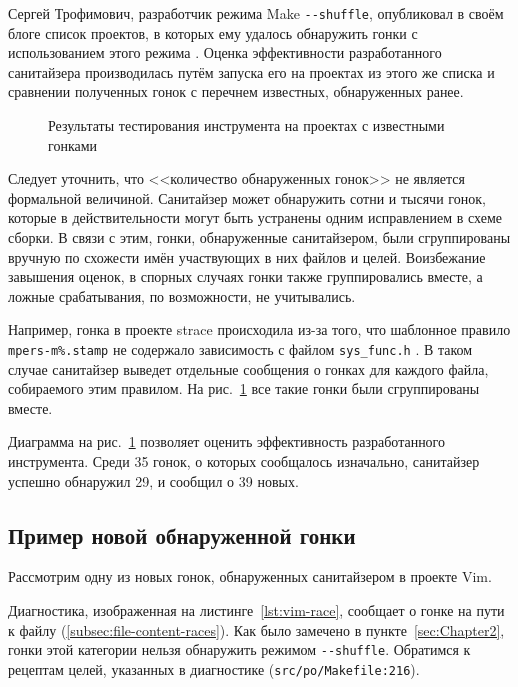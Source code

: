 Сергей Трофимович, разработчик режима Make \texttt{-{}-shuffle}, опубликовал в своём блоге список проектов, в которых ему удалось обнаружить гонки с использованием этого режима \cite{trofi-make-shuffle}. Оценка эффективности разработанного санитайзера производилась путём запуска его на проектах из этого же списка и сравнении полученных гонок с перечнем известных, обнаруженных ранее.

\begin{figure}[H]
    \centering
    
    \caption{Результаты тестирования инструмента на проектах с известными гонками}
    \label{fig:testing-results}
\end{figure}

Следует уточнить, что <<количество обнаруженных гонок>> не является формальной величиной. Санитайзер может обнаружить сотни и тысячи гонок, которые в действительности могут быть устранены одним исправлением в схеме сборки. В связи с этим, гонки, обнаруженные санитайзером, были сгруппированы вручную по схожести имён участвующих в них файлов и целей. Воизбежание завышения оценок, в спорных случаях гонки также группировались вместе, а ложные срабатывания, по возможности, не учитывались.

Например, гонка в проекте strace происходила из-за того, что шаблонное правило \texttt{mpers-m\%.stamp} не содержало зависимость с файлом \texttt{sys\_func.h} \cite{strace-race}. В таком случае санитайзер выведет отдельные сообщения о гонках для каждого файла, собираемого этим правилом. На рис.~\ref{fig:testing-results} все такие гонки были сгруппированы вместе.

Диаграмма на рис.~\ref{fig:testing-results} позволяет оценить эффективность разработанного инструмента. Среди 35 гонок, о которых сообщалось изначально, санитайзер успешно обнаружил 29, и сообщил о 39 новых.

\subsection{Пример новой обнаруженной гонки}

Рассмотрим одну из новых гонок, обнаруженных санитайзером в проекте Vim.



Диагностика, изображенная на листинге~\ref{lst:vim-race}, сообщает о гонке на пути к файлу (\ref{subsec:file-content-races}). Как было замечено в пункте~\ref{sec:Chapter2}, гонки этой категории нельзя обнаружить режимом \texttt{-{}-shuffle}. Обратимся к рецептам целей, указанных в диагностике (\texttt{src/po/Makefile:216}).

